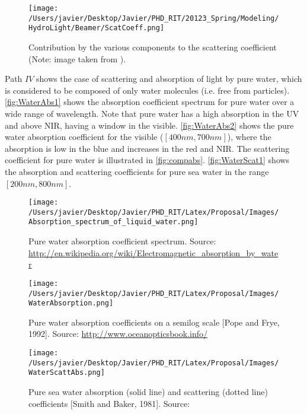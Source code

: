 \begin{figure}[htb]
\centering
      \texttt{[image: /Users/javier/Desktop/Javier/PHD\_RIT/20123\_Spring/Modeling/HydroLight/Beamer/ScatCoeff.png]}
      \caption{Contribution by the various components to the scattering coefficient (Note: image taken from \cite{Mobley:2001}).}
      \label{fig:compscat}
\end{figure}

Path $IV$ shows the case of scattering and absorption of light by pure water, which is considered to be composed of only water molecules (i.e. free from particles). \autoref{fig:WaterAbs1} shows the absorption coefficient spectrum for pure water over a wide range of wavelength. Note that pure water has a high absorption in the UV and above NIR, having a window in the visible. \autoref{fig:WaterAbs2} shows the pure water absorption coefficient for the visible ($[400nm,700nm]$), where the absorption is low in the blue and increases in the red and NIR. The scattering coefficient for pure water is illustrated in \autoref{fig:compabs}. \autoref{fig:WaterScat1} shows the absorption and scattering coefficients for pure sea water in the range $[200nm,800nm]$.

\begin{figure}[!ht]
  \centering
      \texttt{[image: /Users/javier/Desktop/Javier/PHD\_RIT/Latex/Proposal/Images/Absorption\_spectrum\_of\_liquid\_water.png]}
  \caption{Pure water absorption coefficient spectrum. Source: \protect\url{http://en.wikipedia.org/wiki/Electromagnetic_absorption_by_water}}
  \label{fig:WaterAbs1}
\end{figure}

\begin{figure}[!ht]
  \centering
      \texttt{[image: /Users/javier/Desktop/Javier/PHD\_RIT/Latex/Proposal/Images/WaterAbsorption.png]}
  \caption{Pure water absorption coefficients on a semilog scale [Pope and Frye, 1992].  Source: \protect\url{http://www.oceanopticsbook.info/}}
  \label{fig:WaterAbs2}
\end{figure}

\begin{figure}[!ht]
  \centering
      \texttt{[image: /Users/javier/Desktop/Javier/PHD\_RIT/Latex/Proposal/Images/WaterScattAbs.png]}
  \caption{Pure sea water absorption (solid line)  and scattering (dotted line) coefficients [Smith and Baker, 1981]. Source: \cite{Mobley1994}}
  \label{fig:WaterScat1}
\end{figure}

